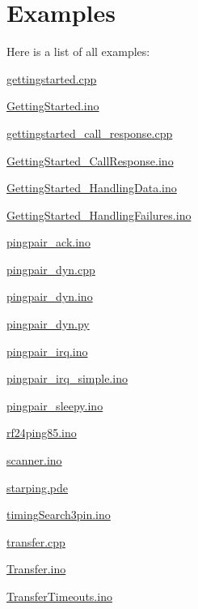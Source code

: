 \section{Examples}
Here is a list of all examples\+:\begin{DoxyCompactItemize}
\item 
\hyperlink{gettingstarted_8cpp-example}{gettingstarted.\+cpp}
\item 
\hyperlink{GettingStarted_8ino-example}{Getting\+Started.\+ino}
\item 
\hyperlink{gettingstarted_call_response_8cpp-example}{gettingstarted\+\_\+call\+\_\+response.\+cpp}
\item 
\hyperlink{GettingStarted_CallResponse_8ino-example}{Getting\+Started\+\_\+\+Call\+Response.\+ino}
\item 
\hyperlink{GettingStarted_HandlingData_8ino-example}{Getting\+Started\+\_\+\+Handling\+Data.\+ino}
\item 
\hyperlink{GettingStarted_HandlingFailures_8ino-example}{Getting\+Started\+\_\+\+Handling\+Failures.\+ino}
\item 
\hyperlink{pingpair_ack_8ino-example}{pingpair\+\_\+ack.\+ino}
\item 
\hyperlink{pingpair_dyn_8cpp-example}{pingpair\+\_\+dyn.\+cpp}
\item 
\hyperlink{pingpair_dyn_8ino-example}{pingpair\+\_\+dyn.\+ino}
\item 
\hyperlink{pingpair_dyn_8py-example}{pingpair\+\_\+dyn.\+py}
\item 
\hyperlink{pingpair_irq_8ino-example}{pingpair\+\_\+irq.\+ino}
\item 
\hyperlink{pingpair_irq_simple_8ino-example}{pingpair\+\_\+irq\+\_\+simple.\+ino}
\item 
\hyperlink{pingpair_sleepy_8ino-example}{pingpair\+\_\+sleepy.\+ino}
\item 
\hyperlink{rf24ping85_8ino-example}{rf24ping85.\+ino}
\item 
\hyperlink{scanner_8ino-example}{scanner.\+ino}
\item 
\hyperlink{starping_8pde-example}{starping.\+pde}
\item 
\hyperlink{timingSearch3pin_8ino-example}{timing\+Search3pin.\+ino}
\item 
\hyperlink{transfer_8cpp-example}{transfer.\+cpp}
\item 
\hyperlink{Transfer_8ino-example}{Transfer.\+ino}
\item 
\hyperlink{TransferTimeouts_8ino-example}{Transfer\+Timeouts.\+ino}
\end{DoxyCompactItemize}
